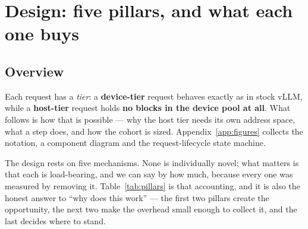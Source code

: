 %
%

\section{Design: five pillars, and what each one buys}
\label{sec:design}

\subsection{Overview}
\label{sec:design:overview}

Each request has a \emph{tier}: a \textbf{device-tier} request behaves exactly as
in stock vLLM, while a \textbf{host-tier} request holds \textbf{no blocks in the
device pool at all}. What follows is how that is possible --- why the host tier
needs its own address space, what a step does, and how the cohort is sized.
Appendix~\ref{app:figures} collects the notation, a component diagram and the
request-lifecycle state machine.

The design rests on five mechanisms. None is individually novel; what matters is
that each is load-bearing, and we can say by how much, because every one was
measured by removing it. Table~\ref{tab:pillars} is that accounting, and it is
also the honest answer to ``why does this work'' --- the first two pillars create
the opportunity, the next two make the overhead small enough to collect it, and
the last decides where to stand.

